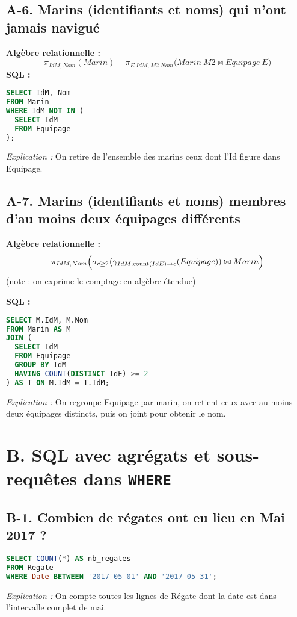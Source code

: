 \documentclass[a4paper,11pt]{article}
\begin{document}
\subsection*{A-6. Marins (identifiants et noms) qui n’ont jamais navigué}
\textbf{Algèbre relationnelle :}
\[
  \pi_{IdM,Nom}(Marin) - \pi_{E.IdM, M2.Nom}\bigl(
    Marin~M2 \bowtie Equipage~E
  \bigr)
\]
\textbf{SQL :}
\begin{lstlisting}[language=SQL]
SELECT IdM, Nom
FROM Marin
WHERE IdM NOT IN (
  SELECT IdM
  FROM Equipage
);
\end{lstlisting}
\textit{Explication :} On retire de l'ensemble des marins ceux dont l'Id figure dans Equipage.

\subsection*{A-7. Marins (identifiants et noms) membres d’au moins deux équipages diff\'erents}
\textbf{Algèbre relationnelle :}
\[
  \pi_{IdM, Nom}\Bigl(
    \sigma_{c\ge2} \bigl(
      \gamma_{IdM; \mathrm{count}(IdE) \rightarrow c}(Equipage)
    ) \bowtie Marin
  \Bigr)
\]
(note : on exprime le comptage en algèbre étendue)

\textbf{SQL :}
\begin{lstlisting}[language=SQL]
SELECT M.IdM, M.Nom
FROM Marin AS M
JOIN (
  SELECT IdM
  FROM Equipage
  GROUP BY IdM
  HAVING COUNT(DISTINCT IdE) >= 2
) AS T ON M.IdM = T.IdM;
\end{lstlisting}
\textit{Explication :} On regroupe Equipage par marin, on retient ceux avec au moins deux équipages distincts, puis on joint pour obtenir le nom.

\newpage
\section*{B. SQL avec agrégats et sous-requêtes dans \texttt{WHERE}}

\subsection*{B-1. Combien de régates ont eu lieu en Mai 2017 ?}
\begin{lstlisting}[language=SQL]
SELECT COUNT(*) AS nb_regates
FROM Regate
WHERE Date BETWEEN '2017-05-01' AND '2017-05-31';
\end{lstlisting}
\textit{Explication :} On compte toutes les lignes de Régate dont la date est dans l'intervalle complet de mai.
\end{document}
